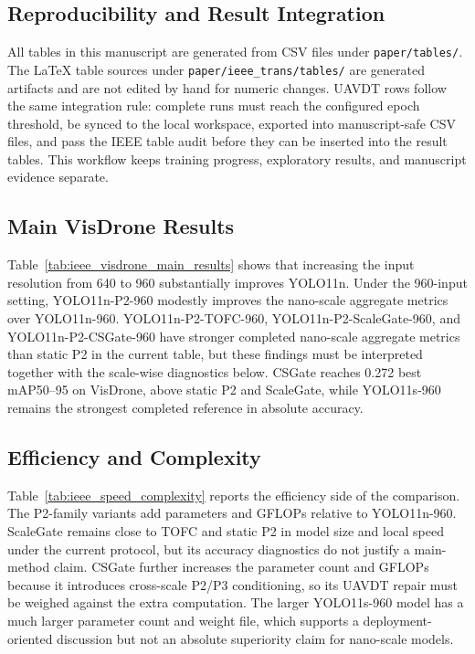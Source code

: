 \documentclass[journal]{IEEEtran}
\begin{document}
\subsection{Reproducibility and Result Integration}

All tables in this manuscript are generated from CSV files under \texttt{paper/tables/}. The LaTeX table sources under \texttt{paper/ieee\_trans/tables/} are generated artifacts and are not edited by hand for numeric changes. UAVDT rows follow the same integration rule: complete runs must reach the configured epoch threshold, be synced to the local workspace, exported into manuscript-safe CSV files, and pass the IEEE table audit before they can be inserted into the result tables. This workflow keeps training progress, exploratory results, and manuscript evidence separate.

\subsection{Main VisDrone Results}



Table~\ref{tab:ieee_visdrone_main_results} shows that increasing the input resolution from 640 to 960 substantially improves YOLO11n. Under the 960-input setting, YOLO11n-P2-960 modestly improves the nano-scale aggregate metrics over YOLO11n-960. YOLO11n-P2-TOFC-960, YOLO11n-P2-ScaleGate-960, and YOLO11n-P2-CSGate-960 have stronger completed nano-scale aggregate metrics than static P2 in the current table, but these findings must be interpreted together with the scale-wise diagnostics below. CSGate reaches 0.272 best mAP50--95 on VisDrone, above static P2 and ScaleGate, while YOLO11s-960 remains the strongest completed reference in absolute accuracy.

\subsection{Efficiency and Complexity}



Table~\ref{tab:ieee_speed_complexity} reports the efficiency side of the comparison. The P2-family variants add parameters and GFLOPs relative to YOLO11n-960. ScaleGate remains close to TOFC and static P2 in model size and local speed under the current protocol, but its accuracy diagnostics do not justify a main-method claim. CSGate further increases the parameter count and GFLOPs because it introduces cross-scale P2/P3 conditioning, so its UAVDT repair must be weighed against the extra computation. The larger YOLO11s-960 model has a much larger parameter count and weight file, which supports a deployment-oriented discussion but not an absolute superiority claim for nano-scale models.
\end{document}
